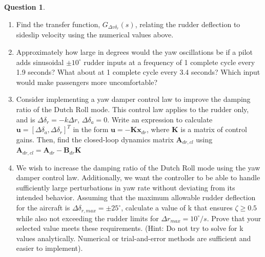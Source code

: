 \documentclass{article}
\theoremstyle{definition}
\newtheorem{question}{Question}
\begin{document}
\begin{question}
\begin{enumerate}[label=\alph*)]
    \item Find the transfer function, $G_{\Delta v \delta_r}(s)$, relating the rudder deflection to sideslip velocity using the numerical values above.

    \item Approximately how large in degrees would the yaw oscillations be if a pilot adds sinusoidal $\pm 10^\circ$ rudder inputs at a frequency of 1 complete cycle every 1.9 seconds? What about at 1 complete cycle every 3.4 seconds? Which input would make passengers more uncomfortable?

    \item Consider implementing a yaw damper control law to improve the damping ratio of the Dutch Roll mode. This control law applies to the rudder only, and is $\Delta \delta_r = -k \Delta r$, $\Delta \delta_a = 0$.
    Write an expression to calculate $\mathbf{u} = [\Delta \delta_a, \Delta \delta_r]^T$ in the form $\mathbf{u} = -\mathbf{K} \mathbf{x}_{dr}$, where $\mathbf{K}$ is a matrix of control gains. Then, find the closed-loop dynamics matrix $\mathbf{A}_{dr,cl}$ using $\mathbf{A}_{dr,cl} = \mathbf{A}_{dr} - \mathbf{B}_{dr} \mathbf{K}$

    \item We wish to increase the damping ratio of the Dutch Roll mode using the yaw damper control law. Additionally, we want the controller to be able to handle sufficiently large perturbations in yaw rate without deviating from its intended behavior. Assuming that the maximum allowable rudder deflection for the aircraft is $\Delta \delta_{r,max} = \pm 25^\circ$, calculate a value of k that ensures $\zeta \ge 0.5$ while also not exceeding the rudder limits for $\Delta r_{max} = 10^\circ/s$. Prove that your selected value meets these requirements.
    (Hint: Do not try to solve for k values analytically. Numerical or trial-and-error methods are sufficient and easier to implement).
    \end{enumerate}
\end{question}
\vspace{0.1cm}
\end{document}
